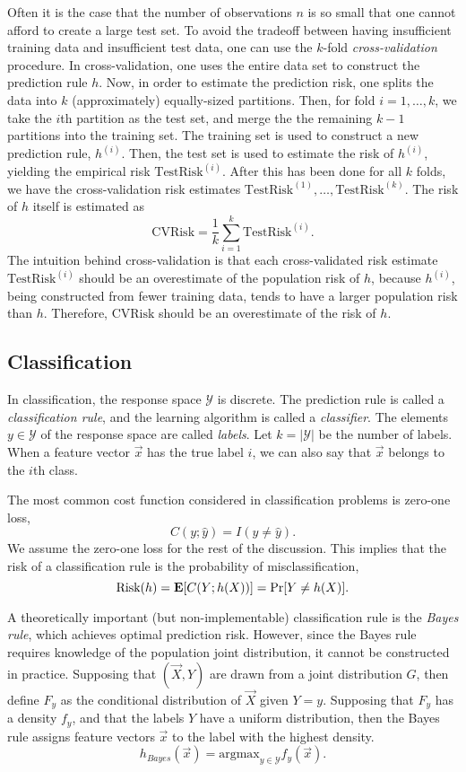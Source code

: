 Often it is the case that the number of observations $n$ is so small
that one cannot afford to create a large test set.  To avoid the
tradeoff between having insufficient training data and insufficient
test data, one can use the $k$-fold \emph{cross-validation} procedure.
In cross-validation, one uses the entire data set to construct the
prediction rule $h$.  Now, in order to estimate the prediction risk,
one splits the data into $k$ (approximately) equally-sized partitions.
Then, for fold $i = 1,\hdots, k$, we take the $i$th partition as the
test set, and merge the the remaining $k-1$ partitions into the
training set.  The training set is used to construct a new prediction
rule, $h^{(i)}$.  Then, the test set is used to estimate the risk of
$h^{(i)}$, yielding the empirical risk $\text{TestRisk}^{(i)}$.  After
this has been done for all $k$ folds, we have the cross-validation
risk estimates $\text{TestRisk}^{(1)},\hdots, \text{TestRisk}^{(k)}$.
The risk of $h$ itself is estimated as
\[
\text{CVRisk} = \frac{1}{k}\sum_{i=1}^k \text{TestRisk}^{(i)}.
\]
The intuition behind cross-validation is that each cross-validated
risk estimate $\text{TestRisk}^{(i)}$ should be an overestimate of the
population risk of $h$, because $h^{(i)}$, being constructed from
fewer training data, tends to have a larger population risk than $h$.
Therefore, $\text{CVRisk}$ should be an overestimate of the risk of
$h$.

\subsection{Classification}

In classification, the response space $\mathcal{Y}$ is discrete.  The
prediction rule is called a \emph{classification rule}, and the
learning algorithm is called a \emph{classifier}.  The elements $y \in
\mathcal{Y}$ of the response space are called \emph{labels}.  Let $k =
|\mathcal{Y}|$ be the number of labels.  When a feature vector
$\vec{x}$ has the true label $i$, we can also say that $\vec{x}$
belongs to the $i$th class.

The most common cost function considered in classification problems is
zero-one loss,
\[
C(y;\hat{y}) = I(y \neq \hat{y}).
\]
We assume the zero-one loss for the rest of the discussion.  This
implies that the risk of a classification rule is the probability of
misclassification,
\[
\text{Risk}(h) = \textbf{E}[C(Y; h(X))] = \Pr[Y \neq h(X)].
\]

A theoretically important (but non-implementable) classification rule
is the \emph{Bayes rule}, which achieves optimal prediction risk.
However, since the Bayes rule requires knowledge of the population
joint distribution, it cannot be constructed in practice.  Supposing
that $(\vec{X}, Y)$ are drawn from a joint distribution $G$, then
define $F_y$ as the conditional distribution of $\vec{X}$ given $Y =
y$.  Supposing that $F_y$ has a density $f_y$, and that the labels $Y$
have a uniform distribution, then the Bayes rule assigns feature
vectors $\vec{x}$ to the label with the highest density.
\[
h_{Bayes}(\vec{x}) = \text{argmax}_{y \in \mathcal{Y}} f_y(\vec{x}).
\]

